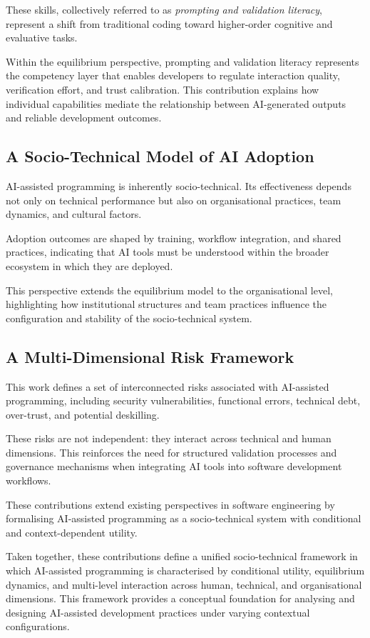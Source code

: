 \documentclass[conference]{IEEEtran}
\begin{document}
These skills, collectively referred to as \textit{prompting and validation literacy}, represent a shift from traditional coding toward higher-order cognitive and evaluative tasks.

Within the equilibrium perspective, prompting and validation literacy represents the competency layer that enables developers to regulate interaction quality, verification effort, and trust calibration. This contribution explains how individual capabilities mediate the relationship between AI-generated outputs and reliable development outcomes.

\subsection{A Socio-Technical Model of AI Adoption}

AI-assisted programming is inherently socio-technical. Its effectiveness depends not only on technical performance but also on organisational practices, team dynamics, and cultural factors.

Adoption outcomes are shaped by training, workflow integration, and shared practices, indicating that AI tools must be understood within the broader ecosystem in which they are deployed.

This perspective extends the equilibrium model to the organisational level, highlighting how institutional structures and team practices influence the configuration and stability of the socio-technical system.

\subsection{A Multi-Dimensional Risk Framework}

This work defines a set of interconnected risks associated with AI-assisted programming, including security vulnerabilities, functional errors, technical debt, over-trust, and potential deskilling.

These risks are not independent: they interact across technical and human dimensions. This reinforces the need for structured validation processes and governance mechanisms when integrating AI tools into software development workflows.

These contributions extend existing perspectives in software engineering by formalising AI-assisted programming as a socio-technical system with conditional and context-dependent utility.

Taken together, these contributions define a unified socio-technical framework in which AI-assisted programming is characterised by conditional utility, equilibrium dynamics, and multi-level interaction across human, technical, and organisational dimensions. This framework provides a conceptual foundation for analysing and designing AI-assisted development practices under varying contextual configurations.
\end{document}
